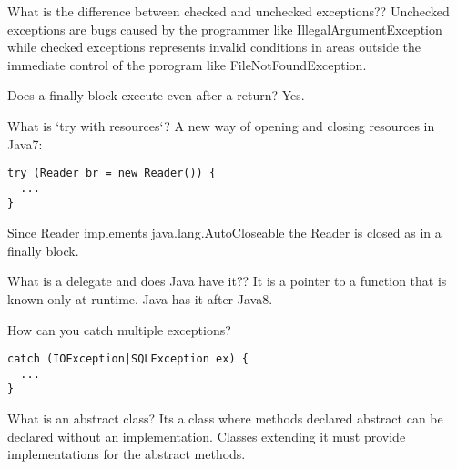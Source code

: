 \documentclass[avery5371,grid]{flashcards}
\begin{document}
\begin{flashcard}[Lang]{What is the difference between checked and unchecked exceptions??}
Unchecked exceptions are bugs caused by the programmer like IllegalArgumentException while checked exceptions represents invalid conditions in areas outside the immediate control of the porogram like FileNotFoundException.

\begin{flashcard}[Lang]{Does a finally block execute even after a return?}
Yes.
\end{flashcard}

\begin{flashcard}[Lang]{What is `try with resources`?}
A new way of opening and closing resources in Java7:
\begin{lstlisting}[frame=single]
try (Reader br = new Reader()) {
  ...
}
\end{lstlisting}
Since Reader implements java.lang.AutoCloseable the Reader is closed as in a finally block.
\end{flashcard}

\begin{flashcard}[Lang]{What is a delegate and does Java have it??}
It is a pointer to a function that is known only at runtime. Java has it after Java8.
\end{flashcard}

\begin{flashcard}[Lang]{How can you catch multiple exceptions?}
\begin{lstlisting}[frame=single]
catch (IOException|SQLException ex) {
  ...
}
\end{lstlisting}
\end{flashcard}

\begin{flashcard}[Lang]{What is an abstract class?}
Its a class where methods declared abstract can be declared without an implementation. Classes extending it must provide implementations for the abstract methods.
\end{flashcard}


\end{flashcard}
\end{document}
